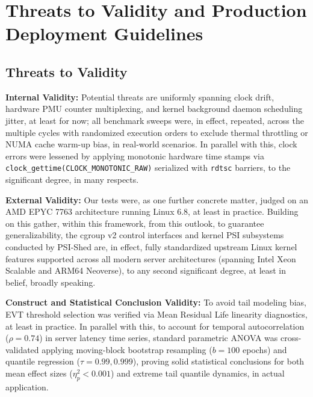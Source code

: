 \documentclass[pdflatex,sn-mathphys,Numbered]{sn-jnl}
\begin{document}
\section{Threats to Validity and Production Deployment Guidelines}
\label{sec:threats}

\subsection{Threats to Validity}
\textbf{Internal Validity:} Potential threats are uniformly spanning clock drift, hardware PMU counter multiplexing, and kernel background daemon scheduling jitter, at least for now; all benchmark sweeps were, in effect, repeated, across the multiple cycles with randomized execution orders to exclude thermal throttling or NUMA cache warm-up bias, in real-world scenarios. In parallel with this, clock errors were lessened by applying monotonic hardware time stamps via \texttt{clock\_gettime(CLOCK\_MONOTONIC\_RAW)} serialized with \texttt{rdtsc} barriers, to the significant degree, in many respects.

\textbf{External Validity:} Our tests were, as one further concrete matter, judged on an AMD EPYC 7763 architecture running Linux 6.8, at least in practice. Building on this gather, within this framework, from this outlook, to guarantee generalizability, the cgroup v2 control interfaces and kernel PSI subsystems conducted by PSI-Shed are, in effect, fully standardized upstream Linux kernel features supported across all modern server architectures (spanning Intel Xeon Scalable and ARM64 Neoverse), to any second significant degree, at least in belief, broadly speaking.

\textbf{Construct and Statistical Conclusion Validity:} To avoid tail modeling bias, EVT threshold selection was verified via Mean Residual Life linearity diagnostics, at least in practice. In parallel with this, to account for temporal autocorrelation ($\rho = 0.74$) in server latency time series, standard parametric ANOVA was cross-validated applying moving-block bootstrap resampling ($b = 100$ epochs) and quantile regression ($\tau = 0.99, 0.999$), proving solid statistical conclusions for both mean effect sizes ($\eta_p^2 < 0.001$) and extreme tail quantile dynamics, in actual application.
\end{document}
